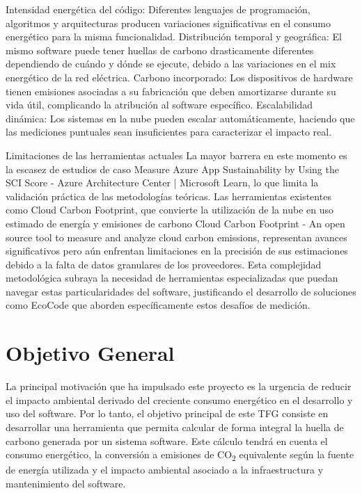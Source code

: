 \documentclass[12pt,a4paper]{report}
\begin{document}
Intensidad energética del código: Diferentes lenguajes de programación, algoritmos y arquitecturas producen variaciones significativas en el consumo energético para la misma funcionalidad.
Distribución temporal y geográfica: El mismo software puede tener huellas de carbono drasticamente diferentes dependiendo de cuándo y dónde se ejecute, debido a las variaciones en el mix energético de la red eléctrica.
Carbono incorporado: Los dispositivos de hardware tienen emisiones asociadas a su fabricación que deben amortizarse durante su vida útil, complicando la atribución al software específico.
Escalabilidad dinámica: Los sistemas en la nube pueden escalar automáticamente, haciendo que las mediciones puntuales sean insuficientes para caracterizar el impacto real.

Limitaciones de las herramientas actuales
La mayor barrera en este momento es la escasez de estudios de caso Measure Azure App Sustainability by Using the SCI Score - Azure Architecture Center | Microsoft Learn, lo que limita la validación práctica de las metodologías teóricas. Las herramientas existentes como Cloud Carbon Footprint, que convierte la utilización de la nube en uso estimado de energía y emisiones de carbono Cloud Carbon Footprint - An open source tool to measure and analyze cloud carbon emissions, representan avances significativos pero aún enfrentan limitaciones en la precisión de sus estimaciones debido a la falta de datos granulares de los proveedores.
Esta complejidad metodológica subraya la necesidad de herramientas especializadas que puedan navegar estas particularidades del software, justificando el desarrollo de soluciones como EcoCode que aborden específicamente estos desafíos de medición.

\section{Objetivo General}

La principal motivación que ha impulsado este proyecto es la urgencia de
reducir el impacto ambiental derivado del creciente consumo energético en el
desarrollo y uso del software. Por lo tanto, el objetivo principal de este TFG
consiste en desarrollar una herramienta que permita calcular de forma integral
la huella de carbono generada por un sistema software. Este cálculo tendrá en
cuenta el consumo energético, la conversión a emisiones de CO\textsubscript{2}
equivalente según la fuente de energía utilizada y el impacto ambiental
asociado a la infraestructura y mantenimiento del software.
\end{document}
